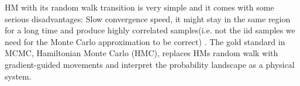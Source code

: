 HM with its random walk transition is very simple and it comes with some serious disadvantages: Slow
convergence speed, it might stay in the same region for a long time and produce highly correlated
samples(i.e. not the iid samples we need for the Monte Carlo approximation to be correct) \cite[]{ML_Bayesian_Pespective}.
The gold standard in MCMC, Hamiltonian Monte Carlo (HMC), replaces HMs random walk with
gradient-guided movements and interpret the probability landscape as a physical system.
 
